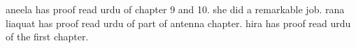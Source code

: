 aneela has proof read urdu of chapter 9 and 10. she did a remarkable job.
rana liaquat has proof read urdu of part of antenna chapter.
hira has proof read urdu of the first chapter.
